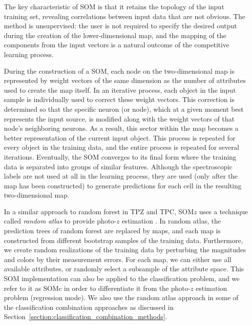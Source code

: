 The key characteristic of SOM is that
it retains the topology of the input training set,
revealing correlations between input data that are not obvious.
The method is unsupervised:
the user is not required to specify the desired output
during the creation of the lower-dimensional map,
and the mapping of the components from the input vectors
is a natural outcome of the competitive learning process.

During the construction of a SOM,
each node on the two-dimensional map is represented by
weight vectors of the same dimension
as the number of attributes used to create the map itself.
In an iterative process,
each object in the input sample is individually used
to correct these weight vectors.
This correction is determined so that the specific neuron (or node),
which at a given moment best represents the input source,
is modified along with the weight vectors
of that node's neighboring neurons.
As a result, this sector within the map
becomes a better representation of the current input object.
This process is repeated for every object in the training data,
and the entire process is repeated for several iterations.
Eventually, the SOM converges to its final form where
the training data is separated into groups of similar features.
Although the spectroscopic labels are not used at all
in the learning process, they are used
(only after the map has been constructed)
to generate predictions for each cell in the resulting two-dimensional map.

In a similar approach to random forest in TPZ and TPC,
SOM$z$ uses a technique called \textit{random atlas}
to provide photo-$z$ estimation \citep{carrascokind2014somz}.
In random atlas, the prediction trees of random forest are replaced by maps,
and each map is constructed from different bootstrap samples
of the training data.
Furthermore, we create random realizations of the training data
by perturbing the magnitudes and colors by their measurement errors.
For each map, we can either use all available attributes,
or randomly select a subsample of the attribute space.
This SOM implementation can also be
applied to the classification problem,
and we refer to it as SOMc
in order to differentiate it from 
the photo-$z$ estimation problem (regression mode).
We also use the random atlas approach
in some of the classification combination approaches as discussed in
Section~\ref{section:classification_combination_methods}.

